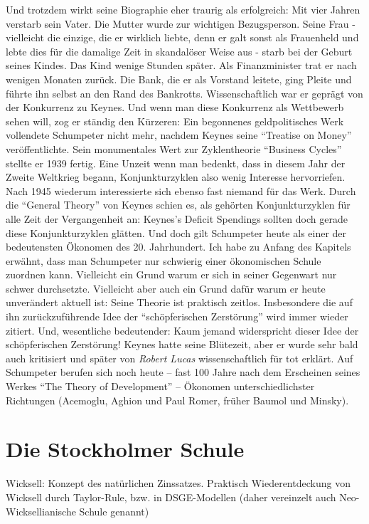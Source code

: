 Und trotzdem wirkt seine Biographie eher traurig als erfolgreich: Mit vier Jahren verstarb sein Vater. Die Mutter wurde zur wichtigen Bezugsperson. Seine Frau - vielleicht die einzige, die er wirklich liebte, denn er galt sonst als Frauenheld und lebte dies für die damalige Zeit in skandalöser Weise aus - starb bei der Geburt seines Kindes. Das Kind wenige Stunden später. 
Als Finanzminister trat er nach wenigen Monaten zurück. Die Bank, die er als Vorstand leitete, ging Pleite und führte ihn selbst an den Rand des Bankrotts. Wissenschaftlich war er geprägt von der Konkurrenz zu Keynes. Und wenn man diese Konkurrenz als Wettbewerb sehen will, zog er ständig den Kürzeren: Ein begonnenes geldpolitisches Werk vollendete Schumpeter nicht mehr, nachdem Keynes seine "`Treatise on Money"' veröffentlichte. Sein monumentales Wert zur Zyklentheorie "`Business Cycles"' stellte er 1939 fertig. Eine Unzeit wenn man bedenkt, dass in diesem Jahr der Zweite Weltkrieg begann, Konjunkturzyklen also wenig Interesse hervorriefen. Nach 1945 wiederum interessierte sich ebenso fast niemand für das Werk. Durch die "`General Theory"' von Keynes schien es, als gehörten Konjunkturzyklen für alle Zeit der Vergangenheit an: Keynes's Deficit Spendings sollten doch gerade diese Konjunkturzyklen glätten.
Und doch gilt Schumpeter heute als einer der bedeutensten Ökonomen des 20. Jahrhundert. Ich habe zu Anfang des Kapitels erwähnt, dass man Schumpeter nur schwierig einer ökonomischen Schule zuordnen kann. Vielleicht ein Grund warum er sich in seiner Gegenwart nur schwer durchsetzte. Vielleicht aber auch ein Grund dafür warum er heute unverändert aktuell ist: Seine Theorie ist praktisch zeitlos. Insbesondere die auf ihn zurückzuführende Idee der "`schöpferischen Zerstörung"' wird immer wieder zitiert. Und, wesentliche bedeutender: Kaum jemand widerspricht dieser Idee der schöpferischen Zerstörung! Keynes hatte seine Blütezeit, aber er wurde sehr bald auch kritisiert und später von \textit{Robert Lucas} wissenschaftlich für tot erklärt. Auf Schumpeter berufen sich noch heute -- fast 100 Jahre nach dem Erscheinen seines Werkes "`The Theory of Development"' -- Ökonomen unterschiedlichster Richtungen (Acemoglu, Aghion und Paul Romer, früher Baumol und Minsky).



\section{Die Stockholmer Schule}
\label{cha:Stockholm}
Wicksell: Konzept des natürlichen Zinssatzes. Praktisch Wiederentdeckung von Wicksell durch Taylor-Rule, bzw. in DSGE-Modellen (daher vereinzelt auch Neo-Wicksellianische Schule genannt)